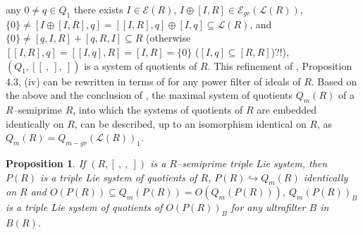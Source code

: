\documentclass[a4paper,11pt]{article}
\newtheorem{prop}[defi]{Proposition}
\begin{document}
any ${0\ne q\in Q_1}$ there exists ${I\in \mathcal{E}(R)}$, 
${I\oplus [I, R]\in \mathcal{E}_{gr}(\mathcal{L}(R))}$, 
${\{0\}\ne [I\oplus [I, R], q]=[[I, R], q]\oplus [I, q]\subseteq 
\mathcal{L}(R)}$, and $\{0\}\ne [q, I, R]+[q, R, I]\subseteq R$ 
(otherwise ${[[I, R], q]=[[I, q], R]=[I, R]=\{0\}}$ (${[I, q]\subseteq [R, R]}$)?!), 
${(Q_1, [[\ ,\ ],\ ])}$ is a system of quotients of $R$. This refinement of 
\cite{QTS}, Proposition 4.3, (iv) can be rewritten in terms of \cite{QTS} for 
any power filter of ideals of $R$. Based on the above and the conclusion of 
\cite{QTS}, the maximal system of quotients $Q_m(R)$ of a $R$--semiprime $R$, 
into which the systems of quotients of $R$ are embedded identically on $R$, can 
be described, up to an isomorphism identical on $R$, as 
${Q_m(R)=Q_{m-gr}(\mathcal{L}(R))_1}$.  

\begin{prop}
If ${(R, [\ ,\ ,\ ])}$ is a $R$--semiprime triple Lie system, then $P(R)$ 
is a triple Lie system of quotients of $R$, 
${P(R)\hookrightarrow Q_m(R)}$ identically on $R$ and  
$O(P(R))\subseteq Q_m(P(R))=O(Q_m(P(R)))$, $Q_m(P(R))_B$ is a triple Lie 
system of quotients of $O(P(R))_B$ for any ultrafilter $B$ in $B(R)$. 
\end{prop}
\end{document}
